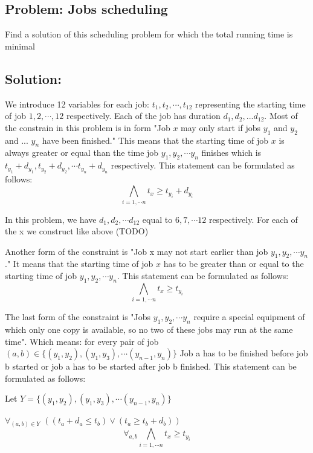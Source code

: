 \documentclass[12pt]{article}
\begin{document}
\subsection*{Problem: Jobs scheduling}
Find a solution of this scheduling problem for which the total running time is minimal

\subsection*{Solution:}
We introduce 12 variables for each job: $t_1, t_2, \cdots , t_{12}$ representing the starting time of job $1, 2, \cdots, 12$ respectively. Each of the job has duration $d_1, d_2, ... d_{12}$. Most of the constrain in this problem is in form "Job $x$ may only start if jobs $y_1$ and $y_2$ and ... $y_n$ have been finished." This means that the starting time of job $x$ is always greater or equal than the time job $y_1, y_2, \cdots y_n$ finishes which is $t_{y_1}+d_{y_1}, t_{y_2}+d_{y_2}, \cdots t_{y_n}+d_{y_n}$ respectively. This statement can be formulated as follows:
\[ \bigwedge_{i=1,\cdots n} t_x \geq t_{y_i}+d_{y_i} \]

In this problem, we have $d_1, d_2, \cdots d_{12}$ equal to $6, 7, \cdots 12$ respectively. For each of the x we construct like above (TODO)

Another form of the constraint is "Job x may not start earlier than job $y_1, y_2, \cdots y_n$." It means that the starting time of job $x$ has to be greater than or equal to the starting time of job $y_1, y_2, \cdots y_n$. This statement can be formulated as follows:
\[ \bigwedge_{i=1,\cdots n} t_x \geq t_{y_i} \]

The last form of the constraint is "Jobs $y_1, y_2, \cdots y_n$ require a special equipment of which only one copy is available, so no two of these jobs may run at the same time". Which means: for every pair of job $(a,b) \in \{(y_1, y_2), (y_1, y_3), \cdots (y_{n-1}, y_{n})\}$ Job a has to be finished before job b started or job a has to be started after job b finished. This statement can be formulated as follows:

Let $Y=\{(y_1, y_2), (y_1, y_3), \cdots (y_{n-1}, y_{n})\}$

   {\Large $\forall_{(a,b) \in Y}$} $((t_a + d_a \leq t_b) \vee (t_a \geq t_b+d_b) )$
   \[ \forall_{a,b}\bigwedge_{i=1,\cdots n} t_x \geq t_{y_i} \]
\end{document}
